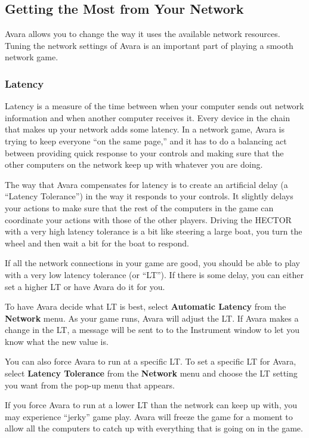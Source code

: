 \documentclass{article}
\begin{document}
\subsection{Getting the Most from Your Network}
Avara allows you to change the way it uses the available network resources. Tuning the network settings of Avara is an important part of playing a smooth network game.

\subsubsection{Latency}
Latency is a measure of the time between when your computer sends out network information and when another computer receives it. Every device in the chain that makes up your network adds some latency. In a network game, Avara is trying to keep everyone ``on the same page,'' and it has to do a balancing act between providing quick response to your controls and making sure that the other computers on the network keep up with whatever you are doing.

The way that Avara compensates for latency is to create an artificial delay (a ``Latency Tolerance'') in the way it responds to your controls. It slightly delays your actions to make sure that the rest of the computers in the game can coordinate your actions with those of the other players. Driving the HECTOR with a very high latency tolerance is a bit like steering a large boat, you turn the wheel and then wait a bit for the boat to respond.

If all the network connections in your game are good, you should be able to play with a very low latency tolerance (or ``LT''). If there is some delay, you can either set a higher LT or have Avara do it for you.

To have Avara decide what LT is best, select \textbf{Automatic Latency} from the \textbf{Network} menu. As your game runs, Avara will adjust the LT. If Avara makes a change in the LT, a message will be sent to to the Instrument window to let you know what the new value is.

You can also force Avara to run at a specific LT. To set a specific LT for Avara, select \textbf{Latency Tolerance} from the \textbf{Network} menu and choose the LT setting you want from the pop-up menu that appears.

If you force Avara to run at a lower LT than the network can keep up with, you may experience ``jerky'' game play. Avara will freeze the game for a moment to allow all the computers to catch up with everything that is going on in the game.
\end{document}
